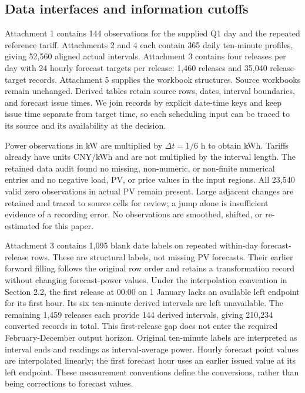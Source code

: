 \subsection{Data interfaces and information cutoffs}\label{data-interfaces-and-information-cutoffs}

Attachment 1 contains 144 observations for the supplied Q1 day and the repeated reference tariff. Attachments 2 and 4 each contain 365 daily ten-minute profiles, giving 52,560 aligned actual intervals. Attachment 3 contains four releases per day with 24 hourly forecast targets per release: 1,460 releases and 35,040 release-target records. Attachment 5 supplies the workbook structures. Source workbooks remain unchanged. Derived tables retain source rows, dates, interval boundaries, and forecast issue times. We join records by explicit date-time keys and keep issue time separate from target time, so each scheduling input can be traced to its source and its availability at the decision.

Power observations in kW are multiplied by \(\Delta t=1/6\) h to obtain kWh. Tariffs already have units CNY/kWh and are not multiplied by the interval length. The retained data audit found no missing, non-numeric, or non-finite numerical entries and no negative load, PV, or price values in the input regions. All 23,540 valid zero observations in actual PV remain present. Large adjacent changes are retained and traced to source cells for review; a jump alone is insufficient evidence of a recording error. No observations are smoothed, shifted, or re-estimated for this paper.

Attachment 3 contains 1,095 blank date labels on repeated within-day forecast-release rows. These are structural labels, not missing PV forecasts. Their earlier forward filling follows the original row order and retains a transformation record without changing forecast-power values. Under the interpolation convention in Section 2.2, the first release at 00:00 on 1 January lacks an available left endpoint for its first hour. Its six ten-minute derived intervals are left unavailable. The remaining 1,459 releases each provide 144 derived intervals, giving 210,234 converted records in total. This first-release gap does not enter the required February-December output horizon. Original ten-minute labels are interpreted as interval ends and readings as interval-average power. Hourly forecast point values are interpolated linearly; the first forecast hour uses an earlier issued value at its left endpoint. These measurement conventions define the conversions, rather than being corrections to forecast values.

